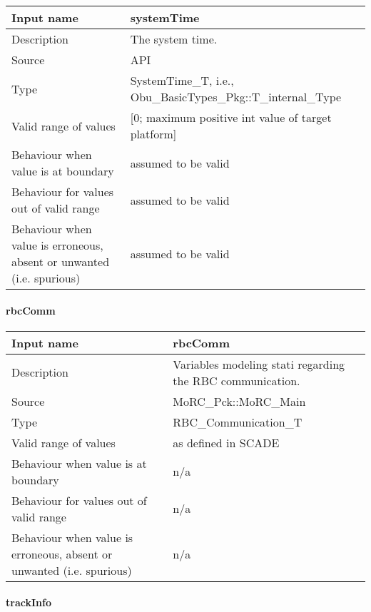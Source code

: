 \begin{longtable}{p{}p{}}
\toprule
Input name				& systemTime \\
\midrule
Description				& The system time. \\
\midrule
Source					& API \\ 
\midrule
Type					& SystemTime\_T, i.e., Obu\_BasicTypes\_Pkg::T\_internal\_Type \\
\midrule
Valid range of values	& [0; maximum positive int value of target platform] \\
\midrule
Behaviour when value is at boundary	& assumed to be valid \\
\midrule
Behaviour for values out of valid range	& assumed to be valid \\
\midrule
Behaviour when value is erroneous, absent or unwanted (i.e. spurious) & assumed to be valid \\
\bottomrule
\end{longtable}

\paragraph{rbcComm}

\begin{longtable}{p{}p{}}
\toprule
Input name				& rbcComm \\
\midrule
Description				& Variables modeling stati regarding the RBC communication. \\
\midrule
Source					& MoRC\_Pck::MoRC\_Main \\ 
\midrule
Type					& RBC\_Communication\_T \\
\midrule
Valid range of values	& as defined in SCADE \\
\midrule
Behaviour when value is at boundary	& n/a \\
\midrule
Behaviour for values out of valid range	& n/a \\
\midrule
Behaviour when value is erroneous, absent or unwanted (i.e. spurious) & n/a \\
\bottomrule
\end{longtable}

\paragraph{trackInfo}

